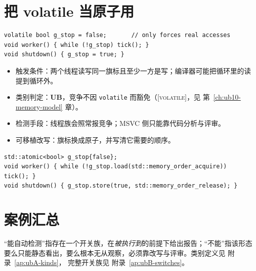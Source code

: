 \documentclass[12pt,a4paper,fontset=fandol]{ctexbook}
\newcommand{\Tp}[1]{\texttt{#1}}
\newcommand{\Bk}{\discretionary{}{}{}}
\newcommand{\UB}{\textbf{\textsf{UB}}}
\newcommand{\Std}[1]{\textsc{[#1]}}
\newcommand{\Mx}[1]{\textsf{#1}}
\begin{document}
\section{把 volatile 当原子用}
\begin{lstlisting}[style=cppstyle, caption={反例：用 volatile 变量做线程间旗标}]
volatile bool g_stop = false;       // only forces real accesses
void worker() { while (!g_stop) tick(); }
void shutdown() { g_stop = true; }
\end{lstlisting}
\begin{itemize}
\item 触发条件：两个线程读写同一旗标且至少一方是写；编译器可能把循环里的读提到循环外。
\item 类别判定：\UB{}，竞争不因 \Tp{vol{\Bk}atile} 而豁免（\Std{vol{\Bk}atile}，见 第~\ref{ch:ub10-memory-model} 章）。
\item 检测手段：线程族会照常报竞争；\Mx{MSVC} 侧只能靠代码分析与评审。
\item 可移植改写：旗标换成原子，并写清它需要的顺序。
\end{itemize}
\begin{lstlisting}[style=cppstyle, caption={改写：原子旗标加显式定序}]
std::atomic<bool> g_stop{false};
void worker() { while (!g_stop.load(std::memory_order_acquire)) tick(); }
void shutdown() { g_stop.store(true, std::memory_order_release); }
\end{lstlisting}

\section{案例汇总}

\begin{guideline}[title=汇总表怎么用]
“能自动检测”指存在一个开关族，在\emph{被执行到}的前提下给出报告；“不能”指该形态
要么只能静态看出，要么根本无从观察，必须靠改写与评审。类别定义见 附录~\ref{ap:ubA-kinds}，
完整开关族见 附录~\ref{ap:ubB-switches}。
\end{guideline}
\end{document}
